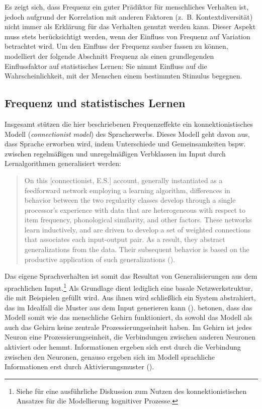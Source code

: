 Es zeigt sich, dass Frequenz ein guter Prädiktor für menschliches Verhalten ist, jedoch aufgrund der Korrelation mit anderen Faktoren (z.~B. Kontextdiversität) nicht immer als Erklärung für das Verhalten genutzt werden kann. Dieser Aspekt muss stets berücksichtigt werden, wenn der Einfluss von Frequenz auf Variation betrachtet wird. Um den Einfluss der Frequenz sauber fassen zu können, modelliert der folgende Abschnitt Frequenz als einen grundlegenden Einflussfaktor auf statistisches Lernen: Sie nimmt Einfluss auf die Wahrscheinlichkeit, mit der Menschen einem bestimmten Stimulus begegnen.

\subsection{Frequenz und statistisches Lernen}
\label{Statistik}

Insgesamt stützen die hier beschriebenen Frequenzeffekte ein konnektionistisches Modell (\textit{connectionist model}) des Spracherwerbs. Dieses Modell geht davon aus, dass Sprache erworben wird, indem Unterschiede und Gemeinsamkeiten bspw. zwischen regelmäßigen und unregelmäßigen Verbklassen im Input durch Lernalgorithmen generalisiert werden: 

\begin{quote} 
On this [connectionist, E.S.] account, generally instantiated as a feedforward network employing a learning algorithm, differences in behavior between the two regularity classes develop through a single processor's experience with data that are heterogeneous with respect to item frequency, phonological similarity, and other factors. These networks learn inductively, and are driven to develop a set of weighted connections that associates each input-output pair. As a result, they abstract generalizations from the data. Their subsequent behavior is based on the productive application of such generalizations (\cite[183]{Hare.2001}).
\end{quote}

Das eigene Sprachverhalten ist somit das Resultat von Generalisierungen aus dem sprachlichen Input.\footnote{Siehe \textcite{Elman.1992} für eine ausführliche Diskussion zum Nutzen des konnektionistischen Ansatzes für die Modellierung kognitiver Prozesse.} Als Grundlage dient lediglich eine basale Netzwerkstruktur, die mit Beispielen gefüllt wird. Aus ihnen wird schließlich ein System abstrahiert, das im Idealfall die Muster aus dem Input generieren kann (\cite[xiii]{Kemmer.2000}). \textcite[xiii]{Kemmer.2000} betonen, dass das Modell somit wie das menschliche Gehirn funktioniert, da sowohl das Modell als auch das Gehirn keine zentrale Prozessierungseinheit haben. Im Gehirn ist jedes Neuron eine Prozessierungseinheit, die Verbindungen zwischen anderen Neuronen aktiviert oder hemmt. Informationen ergeben sich erst durch die Verbindung zwischen den Neuronen, genauso ergeben sich im Modell sprachliche Informationen erst durch Aktivierungsmuster (\cite[xiii]{Kemmer.2000}). 

